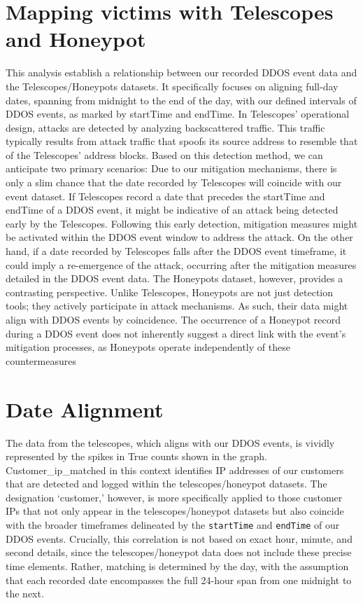 \section{Mapping victims with Telescopes and Honeypot}\label{sec:mapping_victim}
This analysis establish a relationship between our recorded DDOS event data and the Telescopes/Honeypots datasets. It specifically focuses on aligning full-day dates, spanning from midnight to the end of the day, with our defined intervals of DDOS events, as marked by startTime and endTime. 
In Telescopes' operational design, attacks are detected by analyzing backscattered traffic. This traffic typically results from attack traffic that spoofs its source address to resemble that of the Telescopes' address blocks. Based on this detection method, we can anticipate two primary scenarios:
Due to our mitigation mechanisms, there is only a slim chance that the date recorded by Telescopes will coincide with our event dataset. If Telescopes record a date that precedes the startTime and endTime of a DDOS event, it might be indicative of an attack being detected early by the Telescopes. Following this early detection, mitigation measures might be activated within the DDOS event window to address the attack. On the other hand, if a date recorded by Telescopes falls after the DDOS event timeframe, it could imply a re-emergence of the attack, occurring after the mitigation measures detailed in the DDOS event data.
The Honeypots dataset, however, provides a contrasting perspective. Unlike Telescopes, Honeypots are not just detection tools; they actively participate in attack mechanisms. As such, their data might align with DDOS events by coincidence. The occurrence of a Honeypot record during a DDOS event does not inherently suggest a direct link with the event's mitigation processes, as Honeypots operate independently of these countermeasures

\section{Date Alignment}\label{sec:date_events_alignment}
The data from the telescopes, which aligns with our DDOS events, is vividly represented by the spikes in True counts shown in the graph. 
Customer\_ip\_matched in this context identifies IP addresses of our customers that are detected and logged within the telescopes/honeypot datasets. The designation `customer,' however, is more specifically applied to those customer IPs that not only appear in the telescopes/honeypot datasets but also coincide with the broader timeframes delineated by the \texttt{startTime} and \texttt{endTime} of our DDOS events. Crucially, this correlation is not based on exact hour, minute, and second details, since the telescopes/honeypot data does not include these precise time elements. Rather, matching is determined by the day, with the assumption that each recorded date encompasses the full 24-hour span from one midnight to the next.

